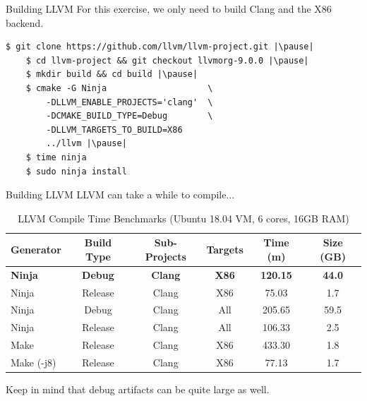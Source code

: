 \documentclass{beamer}
\begin{document}

\begin{frame}[fragile]{Building LLVM}
    For this exercise, we only need to build Clang and the X86 backend.

    \begin{lstlisting}[gobble=4]
    $ git clone https://github.com/llvm/llvm-project.git |\pause|
    $ cd llvm-project && git checkout llvmorg-9.0.0 |\pause|
    $ mkdir build && cd build |\pause|
    $ cmake -G Ninja                    \
        -DLLVM_ENABLE_PROJECTS='clang'  \
        -DCMAKE_BUILD_TYPE=Debug        \
        -DLLVM_TARGETS_TO_BUILD=X86
        ../llvm |\pause|
    $ time ninja
    $ sudo ninja install
    \end{lstlisting}
\end{frame}


\begin{frame}{Building LLVM}
    LLVM can take a while to compile...

    \begin{table}
        \footnotesize
        \centering
        \begin{tabular}{l c c c | c c}
            \toprule
            Generator & Build Type & Sub-Projects & Targets & Time (m) & Size (GB) \\
            \toprule
            \textbf{Ninja} & \textbf{Debug} & \textbf{Clang} & \textbf{X86} & \textbf{120.15} & \textbf{44.0} \\
            Ninja      & Release & Clang & X86 & 75.03  & 1.7  \\
            Ninja      & Debug   & Clang & All & 205.65 & 59.5 \\
            Ninja      & Release & Clang & All & 106.33 & 2.5  \\
            Make       & Release & Clang & X86 & 433.30 & 1.8  \\
            Make (-j8) & Release & Clang & X86 & 77.13  & 1.7  \\
            \bottomrule
        \end{tabular}
        \caption{\footnotesize LLVM Compile Time Benchmarks (Ubuntu 18.04 VM, 6 cores, 16GB RAM)}
    \end{table}

    Keep in mind that debug artifacts can be quite large as well.
\end{frame}
\end{document}

